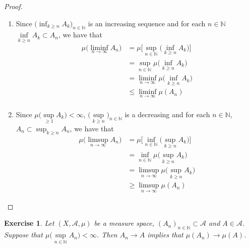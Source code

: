 \documentclass[12pt]{amsart}
\newtheorem{ex}[thm]{Exercise}
\newcommand{\N}{\mathbb{N}}
\newcommand{\MA}{\mathcal{A}}
\begin{document}
\begin{proof}\
	\begin{enumerate}
		\item Since $\bigg(\inf_{k \geq n}A_k \bigg)_{n \in \N}$ is an increasing sequence and for each $n \in \N$ $\inf\limits_{k \geq n}A_k \subset A_n$, we have that
		\begin{align*}
			\mu\bigg(\liminf\limits_{n \rightarrow \infty} A_n \bigg) 
			& = \mu \bigg[\sup_{n \in \N} \bigg(\inf\limits_{k \geq n} A_k \bigg) \bigg] \\
			&= \sup_{n \in \N}  \mu\bigg( \inf_{k \geq n}A_k\bigg)\\
			& = \liminf_{n \rightarrow \infty} \mu\bigg( \inf_{k \geq n}A_k\bigg) \\
			& \leq \liminf_{n \rightarrow \infty}  \mu(A_n) \\
		\end{align*}
		\item Since $\mu\bigg(\sup\limits_{ \geq 1}A_k \bigg) < \infty$, $\bigg(\sup\limits_{k \geq n} \bigg)_{n \in \N}$ is a decreasing and for each $n \in \N$, $A_n \subset \sup_{k \geq n}A_n$, we have that 
		\begin{align*}
			\mu \bigg(\limsup_{n \rightarrow \infty} A_n 
			\bigg) 
			&= \mu \bigg[\inf_{n \in \N} \bigg(\sup_{k  \geq n} A_k \bigg) \bigg] \\
			&= \inf_{n \in \N}\mu\bigg( \sup_{k \geq n} A_k\bigg) \\
			& = \limsup_{n \rightarrow \infty} \mu \bigg( \sup_{k \geq n}A_k \bigg) \\
			& \geq \limsup_{n \rightarrow \infty} \mu ( A_n )\
		\end{align*} 
	\end{enumerate}
\end{proof}

\begin{ex}
	Let $(X, \MA, \mu)$ be a measure space, $(A_n)_{n \in \N} \subset \MA$ and $A \in \MA$. Suppose that $\mu\bigg(\sup\limits_{n \in \N}A_n\bigg) < \infty$. Then $A_n \rightarrow A$ implies that $\mu(A_n) \rightarrow \mu(A)$. 
\end{ex} 
\end{document}
